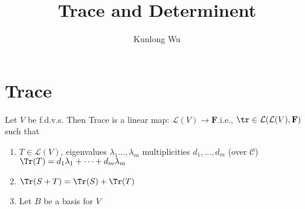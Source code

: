 \documentclass{aq-notes}
\title{Trace and Determinent}
\author{Kunlong Wu}
\begin{document}
    \section{Trace}
    \begin{definition}
        Let $V$ be f.d.v.s. Then Trace is a linear map: $\mathcal{L}(V)\to \mathbf{F}$.i.e., $\tr\in\mathcal{L}(\mathcal{L}(V),\mathbf{F})$ such that
        \begin{enumerate}
            \item   $T\in\mathcal{L}(V)$, eigenvalues $\lambda_1...,\lambda_m$ multiplicities $d_1,...,d_m$ (over $\mathcal{C}$)
            $\Tr(T) = d_1\lambda_1+\cdots + d_m\lambda_m$
            \item   $\Tr(S+T) = \Tr(S)+\Tr(T)$
            \item   Let $B$ be a basis for $V$ 
        \end{enumerate} 
    \end{definition}
\end{document}
